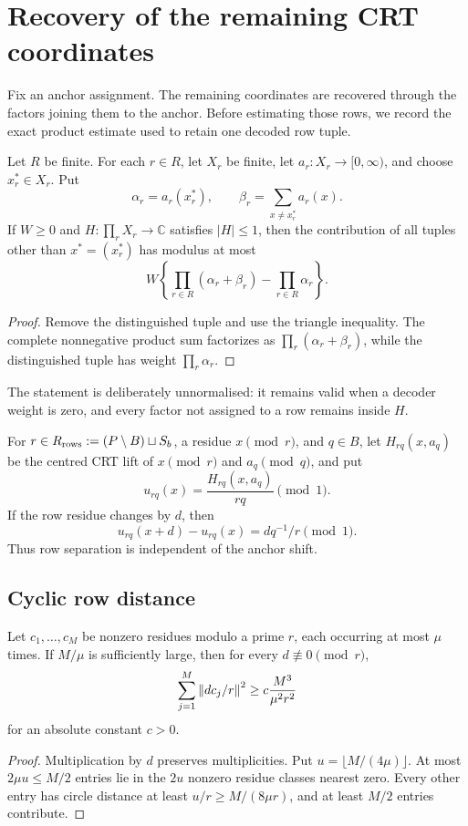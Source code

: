 \section{Recovery of the remaining CRT coordinates}
\label{sec:coordinate-recovery}

Fix an anchor assignment. The remaining coordinates are recovered through the factors joining them to the anchor. Before estimating those rows, we record the exact product estimate used to retain one decoded row tuple.

\begin{lemma}
\label{lem:unnormalised-product-fibre}
Let $R$ be finite. For each $r\in R$, let $X_r$ be finite, let $a_r:X_r\to[0,\infty)$, and choose $x_r^*\in X_r$. Put
\[
 \alpha_r=a_r(x_r^*),\qquad \beta_r=\sum_{x\neq x_r^*}a_r(x).
\]
If $W\geq0$ and $H:\prod_rX_r\to\mathbb C$ satisfies $|H|\leq1$, then the contribution of all tuples other than $x^*=(x_r^*)$ has modulus at most
\[
 W\left\{\prod_{r\in R}(\alpha_r+\beta_r)-\prod_{r\in R}\alpha_r\right\}.
\]
\end{lemma}
\begin{proof}
Remove the distinguished tuple and use the triangle inequality. The complete nonnegative product sum factorizes as $\prod_r(\alpha_r+\beta_r)$, while the distinguished tuple has weight $\prod_r\alpha_r$.
\end{proof}

The statement is deliberately unnormalised: it remains valid when a decoder weight is zero, and every factor not assigned to a row remains inside $H$.

For $r\in R_{\rm rows}:=(P\setminus B)\sqcup S_b$, a residue $x\pmod r$, and $q\in B$, let $H_{rq}(x,a_q)$ be the centred CRT lift of $x\pmod r$ and $a_q\pmod q$, and put
\[
 u_{rq}(x)=\frac{H_{rq}(x,a_q)}{rq}\pmod1.
\]
If the row residue changes by $d$, then
\begin{equation}
\label{eq:row-shift}
 u_{rq}(x+d)-u_{rq}(x)=dq^{-1}/r\pmod1.
\end{equation}
Thus row separation is independent of the anchor shift.

\subsection{Cyclic row distance}

\begin{lemma}
\label{lem:cyclic-energy}
Let $c_1,\ldots,c_M$ be nonzero residues modulo a prime $r$, each occurring at most $\mu$ times. If $M/\mu$ is sufficiently large, then for every $d\not\equiv0\pmod r$,
\[
 \sum_{j=1}^M\left\lVert dc_j/r\right\rVert^2\geq c\frac{M^3}{\mu^2r^2}
\]
for an absolute constant $c>0$.
\end{lemma}
\begin{proof}
Multiplication by $d$ preserves multiplicities. Put $u=\lfloor M/(4\mu)\rfloor$. At most $2\mu u\leq M/2$ entries lie in the $2u$ nonzero residue classes nearest zero. Every other entry has circle distance at least $u/r\geq M/(8\mu r)$, and at least $M/2$ entries contribute.
\end{proof}

